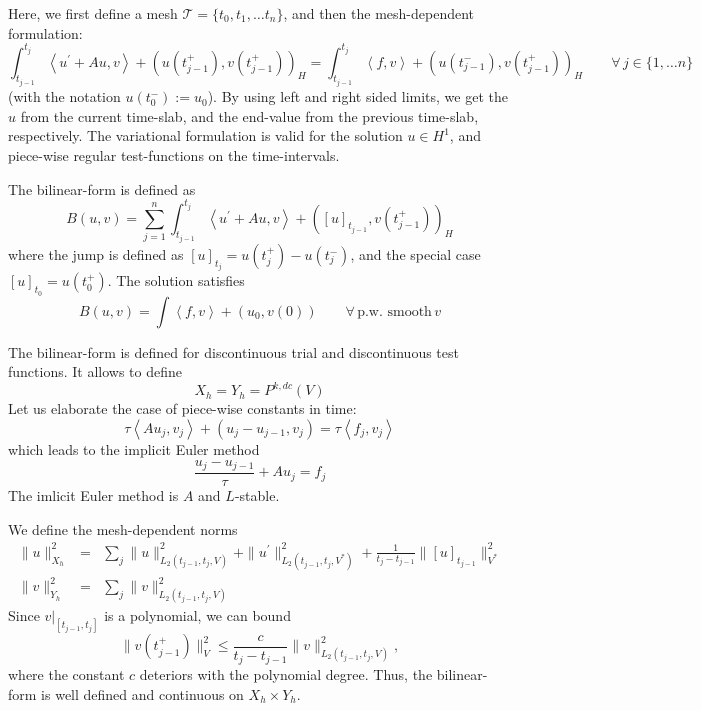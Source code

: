 Here, we first define a mesh $\mathcal T = \{t_0, t_1, \ldots t_n\}$, and then the mesh-dependent formulation:
$$
\int_{t_{j-1}}^{t_j} \left< u^\prime + A u , v \right>  + (u(t_{j-1}^+), v(t_{j-1}^+))_H = \int_{t_{j-1}}^{t_j}  \left< f, v \right> +  (u(t_{j-1}^-), v(t_{j-1}^+))_H  \qquad \forall \, j \in \{ 1, \ldots n\} 
$$
(with the notation $u(t_0^-) := u_0$).
By using left and right sided limits, we get the $u$ from the current time-slab, and the end-value from the previous time-slab, respectively.
The variational formulation is valid for the solution $u \in H^1$, and piece-wise regular test-functions on the time-intervals.

The bilinear-form is defined as
$$
B(u,v) = \sum_{j=1}^n \int_{t_{j-1}}^{t_j} \left< u^\prime + A u , v \right>  + ([u]_{t_{j-1}}, v(t_{j-1}^+))_H 
$$
where the jump is defined as $[u]_{t_j} = u(t_j^+)-u(t_j^-)$, and the special case $[u]_{t_0} = u(t_0^+)$. The solution satisfies
$$
B(u,v) =  \int \left< f, v \right> + (u_0, v(0)) \qquad \forall \, \text{p.w. smooth} \, v
$$

The bilinear-form is defined for discontinuous trial and discontinuous test functions. It allows to define 
$$
X_h = Y_h = P^{k,dc} (V)
$$
Let us elaborate the case of piece-wise constants in time:
$$
\tau \left< A u_j, v_j \right> + ( u_j - u_{j-1}, v_j) = \tau \left<f_j, v_j \right>
$$
which leads to the implicit Euler method
$$
\frac{u_j - u_{j-1}}{\tau} + A u_j = f_j
$$
The imlicit Euler method is $A$ and $L$-stable.

We define the mesh-dependent norms
\begin{eqnarray*}
\| u \|_{X_h}^2 &= &\sum_j \| u \|_{L_2(t_{j-1}, t_j, V)}^2 + \| u^\prime \|_{L_2(t_{j-1}, t_j, V^\ast)}^2 + \tfrac{1}{t_j - t_{j-1}} \| [u] _{t_{j-1}} \|_{V^*}^2 \\
\| v \|_{Y_h}^2 &= &\sum_j \| v \|_{L_2(t_{j-1}, t_j, V)}^2 
\end{eqnarray*}
Since $v|_{[t_{j-1}, t_j]}$ is a polynomial, we can bound
$$
\| v(t_{j-1}^+) \|_V^2 \leq \frac{c}{t_{j} - t_{j-1}} \| v \|^2_{L_2(t_{j-1}, t_j, V)}, 
$$
where the constant $c$ deteriors with the polynomial degree. Thus, the bilinear-form is well defined and continuous on $X_h \times Y_h$.


